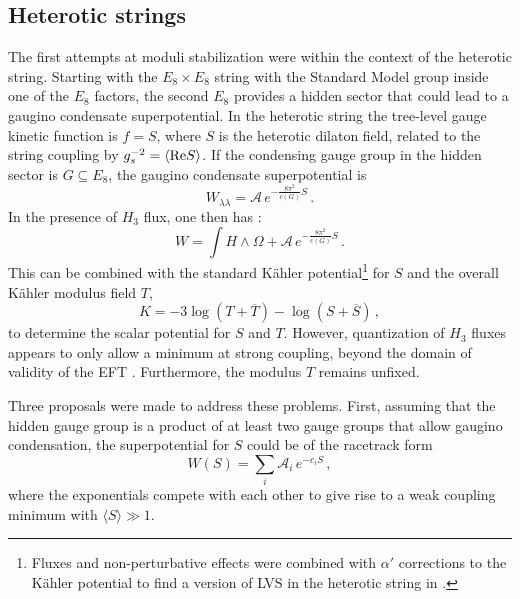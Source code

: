 \documentclass[12pt,a4wide]{article}
\def\be{\begin{equation}}
\def\ee{\end{equation}}
\begin{document}
 
\subsection{Heterotic strings}
The first attempts at moduli stabilization were within the context of the heterotic string. 
Starting with  the  $E_8\times E_8$ string with the Standard Model group  inside one of the $E_8$ factors, the second $E_8$ provides a hidden sector that could lead to a gaugino condensate  superpotential.
In the  heterotic string the tree-level  gauge kinetic function is  $f=S$,
where $S$ is the heterotic dilaton field, related to the string coupling  by $g_s^{-2}=\langle \hbox{Re}S \rangle$.  If the condensing gauge group in the hidden sector is $G \subseteq E_8$, the gaugino condensate superpotential is
\begin{equation}\label{eq:hetcond}
    W_{\lambda\lambda} =\mathcal{A}\,e^{-\frac{8\pi^2}{c(G)} S}\,.
\end{equation}
In the presence of $H_3$ flux, one then has \cite{Derendinger:1985kk, Dine:1985rz}:
\be \label{eq:hetwprob}
W=\int H \wedge \Omega + \mathcal{A}\,e^{-\frac{8\pi^2}{c(G)} S}\,.
\ee
This can be combined with the standard K\"ahler potential\footnote{Fluxes and  non-perturbative  effects were combined with $\alpha'$ corrections to the K\"ahler potential to find a version of LVS in the heterotic string in \cite{Cicoli:2013rwa}.} for $S$ and the overall K\"ahler modulus field $T$,
\be
K=-3\log\left(T+\overline T \right) - \log \left( S+\overline S \right)\,,
\ee
to determine the scalar potential for $S$ and $T$. However, quantization of $H_3$ fluxes appears to only allow a minimum at strong coupling, beyond the domain of validity of the EFT \cite{Dine:1985rz}. Furthermore, the modulus $T$ remains unfixed.

Three proposals were made to address these problems. First, assuming that the hidden gauge group is a product of at least two gauge groups that allow gaugino condensation, the superpotential for $S$ could be  of the racetrack form \cite{Krasnikov:1987jj, Dixon:1990ds, Casas:1990qi} 
\begin{equation}
W(S)=\sum_i \mathcal{A}_i\,e^{-c_iS}\,,
\end{equation}
where the exponentials compete with each other to give rise to a weak coupling minimum with $\langle S \rangle \gg 1$.
\end{document}
